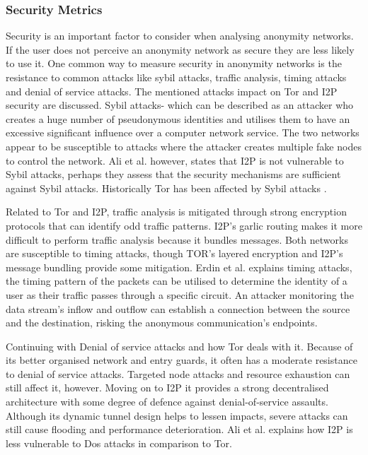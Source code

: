 \documentclass[12pt,conference]{IEEEtran}
\begin{document}
\subsubsection{Security Metrics}
Security is an important factor to consider when analysing anonymity networks. If the user does not perceive an anonymity network as secure they are less likely to use it. One common way to measure security in anonymity networks is the resistance to common attacks like sybil attacks, traffic analysis, timing attacks and denial of service attacks. The mentioned attacks impact on Tor and I2P security are discussed. Sybil attacks- which can be described as an attacker who creates a huge number of pseudonymous identities and utilises them to have an excessive significant influence over a computer network service. The two networks appear to be susceptible to attacks where the attacker creates multiple fake nodes to control the network. Ali et al. \cite{TORVsI2P} however, states that I2P is not vulnerable to Sybil attacks, perhaps they assess that the security mechanisms are sufficient against Sybil attacks. Historically Tor has been affected by Sybil attacks \cite{tor2}. 

Related to Tor and I2P, traffic analysis is mitigated through strong encryption protocols that can identify odd traffic patterns. I2P’s garlic routing makes it more difficult to perform traffic analysis because it bundles messages. Both networks are susceptible to timing attacks, though TOR's layered encryption and I2P's message bundling provide some mitigation. Erdin et al. \cite{hiddenUsers} explains timing attacks, the timing pattern of the packets can be utilised to determine the identity of a user as their traffic passes through a specific circuit. An attacker monitoring the data stream's inflow and outflow can establish a connection between the source and the destination, risking the anonymous communication's endpoints.

Continuing with Denial of service attacks and how Tor deals with it. Because of its better organised network and entry guards, it often has a moderate resistance to denial of service attacks. Targeted node attacks and resource exhaustion can still affect it, however. Moving on to I2P it provides a strong decentralised architecture with some degree of defence against denial-of-service assaults. Although its dynamic tunnel design helps to lessen impacts, severe attacks can still cause flooding and performance deterioration. Ali et al. \cite{TORVsI2P} explains how I2P is less vulnerable to Dos attacks in comparison to Tor.
\end{document}
